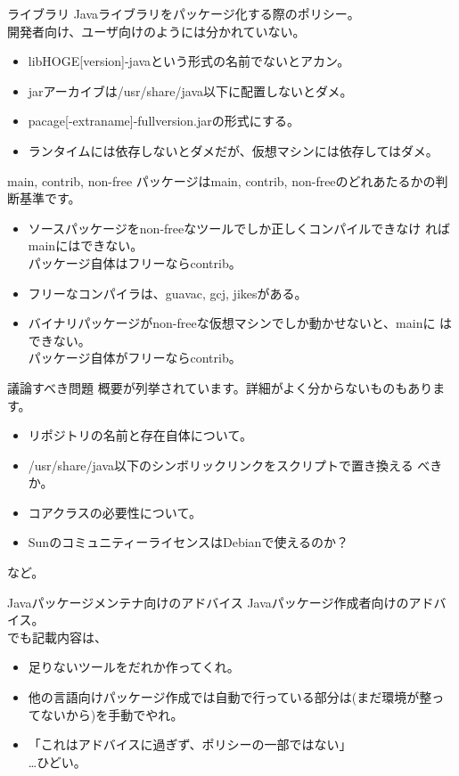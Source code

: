 \begin{frame}{ライブラリ}
 Javaライブラリをパッケージ化する際のポリシー。\\
 開発者向け、ユーザ向けのようには分かれていない。
 \begin{itemize}
  \item libHOGE[version]-javaという形式の名前でないとアカン。
  \item jarアーカイブは/usr/share/java以下に配置しないとダメ。
  \item pacage[-extraname]-fullversion.jarの形式にする。
  \item ランタイムには依存しないとダメだが、仮想マシンには依存してはダメ。
 \end{itemize}
 
\end{frame}

\begin{frame}{main, contrib, non-free}
 パッケージはmain, contrib, non-freeのどれあたるかの判断基準です。
 \begin{itemize}
  \item ソースパッケージをnon-freeなツールでしか正しくコンパイルできなけ
	ればmainにはできない。\\
	パッケージ自体はフリーならcontrib。
  \item フリーなコンパイラは、guavac, gcj, jikesがある。
  \item バイナリパッケージがnon-freeな仮想マシンでしか動かせないと、mainに
	はできない。\\
	パッケージ自体がフリーならcontrib。
 \end{itemize}
\end{frame}

\begin{frame}{議論すべき問題}
概要が列挙されています。詳細がよく分からないものもあります。
 \begin{itemize}
  \item リポジトリの名前と存在自体について。
  \item /usr/share/java以下のシンボリックリンクをスクリプトで置き換える
	べきか。
  \item コアクラスの必要性について。
  \item SunのコミュニティーライセンスはDebianで使えるのか？
 \end{itemize}
など。
\end{frame}

\begin{frame}{Javaパッケージメンテナ向けのアドバイス}
Javaパッケージ作成者向けのアドバイス。\\
でも記載内容は、
 \begin{itemize}
 \item 足りないツールをだれか作ってくれ。
  \item 他の言語向けパッケージ作成では自動で行っている部分は(まだ環境が整っ
	てないから)を手動でやれ。
  \item 「これはアドバイスに過ぎず、ポリシーの一部ではない」\\
	…ひどい。
 \end{itemize}
\end{frame}

